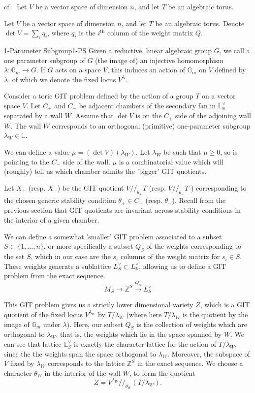 cf.~\cite{Kite_2022,ballard_mori_2013} Let $V$ be a vector space of dimension $n$, and let $T$ be an algebraic torus.

Let $V$ be a vector space of dimension $n$, and let $T$ be an algebraic torus. Denote $\det V = \sum_i q_i$, where $q_i$ is the $i^\mathrm{th}$ column of the weight matrix $Q$. 

\begin{definition}{1-Parameter Subgroup}{1-PS}
    Given a reductive, linear algebraic group $G$, we call a one parameter subgroup of $G$ (the image of) an injective homomorphism $\lambda : \mathbb{G}_{m}\to G$. If $G$ acts on a space $V$, this induces an action of $\mathbb{G}_m$ on $V$ defined by $\lambda$, of which we denote the fixed locus $V^\lambda$. 
\end{definition}

Consider a toric GIT problem defined by the action of a group $T$ on a vector space $V$. Let $C_+$ and $C_-$ be adjacent chambers of the secondary fan in $\mathbb{L}^{\vee}_\mathbb{R}$ separated by a wall $W$. Assume that $\det V$ is on the $C_{+}$ side of the adjoining wall $W$. The wall $W$ corresponds to an orthogonal (primitive) one-parameter subgroup $\lambda_{W}\in \mathbb{L}$.

We can define a value $\mu = (\det V)(\lambda_W)$. Let $\lambda_W$ be such that $\mu \geq 0$, so is pointing to the $C_-$ side of the wall. $\mu$ is a combinatorial value which will (roughly) tell us which chamber admits the 'bigger' GIT quotients. 

Let $X_+$ (resp. $X_-$) be the GIT quotient $V // _{\theta_{+}}T$ (resp. $V // _{\theta_{-}}T$ ) corresponding to the chosen generic stability condition $\theta_{+}\in C_+$ (resp. $\theta_-$).  Recall from the previous section that GIT quotients are invariant across stability conditions in the interior of a given chamber. 

We can define a somewhat 'smaller' GIT problem associated to a subset $S \subset \{ 1,\dots,n \}$, or more specifically a subset $Q_S$ of the weights corresponding to the set $S$, which in our case are the $s_i$ columns of the weight matrix for $s_{i}\in S$. These weights generate a sublattice $L_{S}^\vee\subset L_\mathbb{R}^\vee$, allowing us to define a GIT problem from the exact sequence $$M_{S}\to \mathbb{Z}^{S}\xrightarrow{Q_{S}}L_{S}^{\vee}$$

This GIT problem gives us a strictly lower dimensional variety $Z$, which is a GIT quotient of the fixed locus $V^{\lambda_{W}}$ by $T/\lambda_W$ (where here $T/ \lambda_W$ is the quotient by the image of $\mathbb{G}_m$ under $\lambda$). Here, our subset $Q_S$  is the collection of weights which are orthogonal to $\lambda_W$, that is, the weights which lie in the space spanned by $W$. We can see that lattice $\mathbb{L}_S^\vee$ is exactly the character lattice for the action of $T/\lambda_W$, since the the weights span the space orthogonal to $\lambda_W$. Moreover, the subspace of $V$ fixed by $\lambda_W$ corresponds to the lattice $\mathbb{Z}^S$ in the exact sequence. We choose a character $\theta_W$ in the interior of the wall $W$, to form the quotient $$Z = V^{\lambda_{W}} / /_{\theta_{W}} \left( T/ \lambda_{W}\right) . $$


